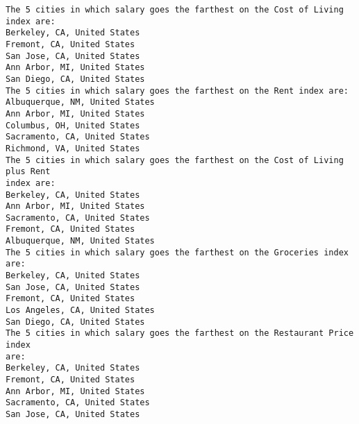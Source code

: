 \documentclass[11pt]{article}
\begin{document}
    \begin{Verbatim}[commandchars=\\\{\}]
The 5 cities in which salary goes the farthest on the Cost of Living index are:
Berkeley, CA, United States
Fremont, CA, United States
San Jose, CA, United States
Ann Arbor, MI, United States
San Diego, CA, United States
The 5 cities in which salary goes the farthest on the Rent index are:
Albuquerque, NM, United States
Ann Arbor, MI, United States
Columbus, OH, United States
Sacramento, CA, United States
Richmond, VA, United States
The 5 cities in which salary goes the farthest on the Cost of Living plus Rent
index are:
Berkeley, CA, United States
Ann Arbor, MI, United States
Sacramento, CA, United States
Fremont, CA, United States
Albuquerque, NM, United States
The 5 cities in which salary goes the farthest on the Groceries index are:
Berkeley, CA, United States
San Jose, CA, United States
Fremont, CA, United States
Los Angeles, CA, United States
San Diego, CA, United States
The 5 cities in which salary goes the farthest on the Restaurant Price index
are:
Berkeley, CA, United States
Fremont, CA, United States
Ann Arbor, MI, United States
Sacramento, CA, United States
San Jose, CA, United States
    \end{Verbatim}
\end{document}
